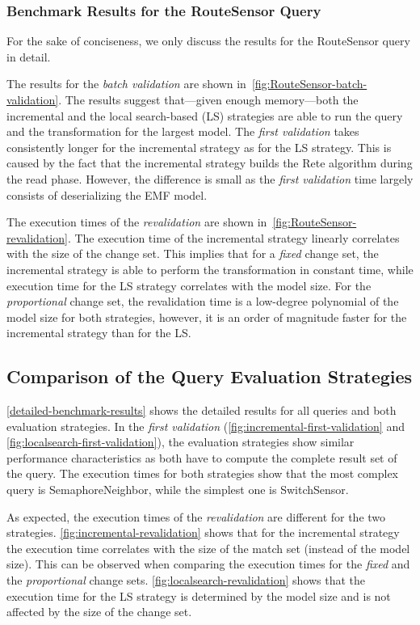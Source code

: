 \documentclass[submission,copyright,creativecommons]{eptcs}
\begin{document}
\subsubsection{Benchmark Results for the \textsf{RouteSensor} Query}

For the sake of conciseness, we only discuss the results for the \textsf{RouteSensor} query in detail. 

The results for the \emph{batch validation} are shown in~\autoref{fig:RouteSensor-batch-validation}. The results suggest that---given enough memory---both the incremental and the local search-based (LS) strategies are able to run the query and the transformation for the largest model. The \emph{first validation} takes consistently longer for the incremental strategy as for the LS strategy. This is caused by the fact that the incremental strategy builds the Rete algorithm during the \textsf{read} phase. However, the difference is small as the \emph{first validation} time largely consists of deserializing the EMF model.

The execution times of the \emph{revalidation} are shown in~\autoref{fig:RouteSensor-revalidation}. The execution time of the incremental strategy linearly correlates with the size of the change set. This implies that for a \emph{fixed} change set, the incremental strategy is able to perform the transformation in constant time, while execution time for the LS strategy correlates with the model size. For the \emph{proportional} change set, the revalidation time is a low-degree polynomial of the model size for both strategies, however, it is an order of magnitude faster for the incremental strategy than for the LS.

\subsection{Comparison of the Query Evaluation Strategies}

\autoref{detailed-benchmark-results} shows the detailed results for all queries and both evaluation strategies. In the \emph{first validation} (\autoref{fig:incremental-first-validation} and \autoref{fig:localsearch-first-validation}), the evaluation strategies show similar performance characteristics as both have to compute the complete result set of the query. The execution times for both strategies show that the most complex query is \textsf{SemaphoreNeighbor}, while the simplest one is \textsf{SwitchSensor}. 

As expected, the execution times of the \emph{revalidation} are different for the two strategies. \autoref{fig:incremental-revalidation} shows that for the incremental strategy the execution time correlates with the size of the match set (instead of the model size). This can be observed when comparing the execution times for the \emph{fixed} and the \emph{proportional} change sets. \autoref{fig:localsearch-revalidation} shows that the execution time for the LS strategy is determined by the model size and is not affected by the size of the change set.
\end{document}
